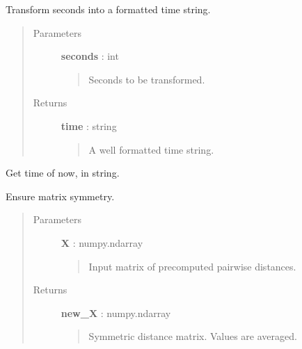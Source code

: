 \documentclass[letterpaper,10pt,english]{sphinxmanual}
\begin{document}

\begin{fulllineitems}
\label{index:adenine.utils.extra.sec_to_time}
Transform seconds into a formatted time string.
\begin{quote}\begin{description}
\item[{Parameters}] \leavevmode
\textbf{seconds} : int
\begin{quote}

Seconds to be transformed.
\end{quote}

\item[{Returns}] \leavevmode
\textbf{time} : string
\begin{quote}

A well formatted time string.
\end{quote}

\end{description}\end{quote}

\end{fulllineitems}


\begin{fulllineitems}
\label{index:adenine.utils.extra.get_time}
Get time of now, in string.

\end{fulllineitems}


\begin{fulllineitems}
\label{index:adenine.utils.extra.ensure_symmetry}
Ensure matrix symmetry.
\begin{quote}\begin{description}
\item[{Parameters}] \leavevmode
\textbf{X} : numpy.ndarray
\begin{quote}

Input matrix of precomputed pairwise distances.
\end{quote}

\item[{Returns}] \leavevmode
\textbf{new\_X} : numpy.ndarray
\begin{quote}

Symmetric distance matrix. Values are averaged.
\end{quote}

\end{description}\end{quote}

\end{fulllineitems}
\end{document}
